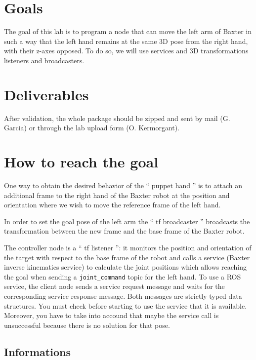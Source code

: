 \documentclass{ecnreport}
\author{G. Garcia, O. Kermorgant}
\begin{document}


\section{Goals}

The goal of this lab is to program a node that can move the left arm of Baxter in such a way that the left hand
remains at the same 3D pose from the right hand, with their z-axes opposed. To do so, we will use services and
3D transformations listeners and broadcasters.

\section{Deliverables}

After validation, the whole package should be zipped and sent by mail (G. Garcia) or through the lab upload form (O. Kermorgant).

\section{How to reach the goal}

One way to obtain the desired behavior of the `` puppet hand '' is to attach an additional frame to the
right hand of the Baxter robot at the position and orientation where we wish to move the reference
frame of the left hand.

In order to set the goal pose of the left arm the `` tf broadcaster '' broadcasts the transformation
between the new frame and the base frame of the Baxter robot.

The controller node is a `` tf listener '': it monitors the position and orientation of the target with
respect to the base frame of the robot and calls a service (Baxter inverse kinematics service) to
calculate the joint positions which allows reaching the goal when sending a \texttt{joint\_command}
topic for the left hand. To use a ROS service, the client node sends a service request message and
waits for the corresponding service response message. Both messages are strictly typed data
structures. You must check before starting to use the service that it is available. Moreover, you have
to take into accound that maybe the service call is unsuccessful because there is no solution for that
pose.


\subsection{Informations}
\end{document}
